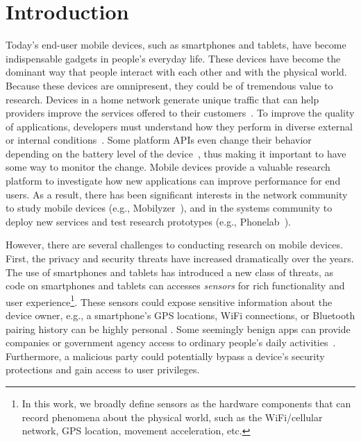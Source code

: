 \section{Introduction}

Today's end-user mobile devices, such as smartphones and
tablets, have become indispensable gadgets in people's everyday
life. These devices have become the dominant way that 
people interact with each other and with the physical world. Because 
these devices are omnipresent, they could be of tremendous value to 
research. Devices in a home network generate 
unique traffic that can help providers improve the services offered 
to their customers~\cite{sundaresan2011broadband}.
To improve the quality of applications, developers must understand 
how they perform in diverse external or internal 
conditions~\cite{ravindranath2012appinsight}. Some platform
APIs even change their behavior depending on the battery level
of the device~\cite{battery}, thus making it important to have 
some way to monitor the change. Mobile devices 
provide a valuable research platform to investigate how new 
applications can improve performance for end users. 
As a result, there has been significant interests in the network
community to study mobile devices
(e.g., Mobilyzer~\cite{nikravesh2015mobilyzer}), and in the
systems community to deploy new services and test research
prototypes (e.g., Phonelab~\cite{phonelab, nandugudi2013phonelab}).  
					
However, there are several challenges to conducting research
on mobile devices. First, the privacy and security threats
have increased dramatically over the years. The use of 
smartphones and tablets has introduced a new class of threats, 
as code on smartphones and tablets can accesses
\textit{sensors} for rich functionality and user experience\footnote{\scriptsize In 
this work, we broadly define sensors as the hardware components 
that can record phenomena about the physical world, such as the 
WiFi/cellular network, GPS location, movement acceleration, etc.}. 
These sensors could expose sensitive information about the device 
owner, e.g., a smartphone's GPS locations,
WiFi connections, or Bluetooth pairing history can be highly
personal \cite{han2012accomplice}. Some seemingly benign apps can provide 
companies or government agency access to ordinary 
people's daily activities~\cite{AngryBirds}. Furthermore, 
a malicious party could potentially bypass a
device's security protections and gain access to user privileges. 

